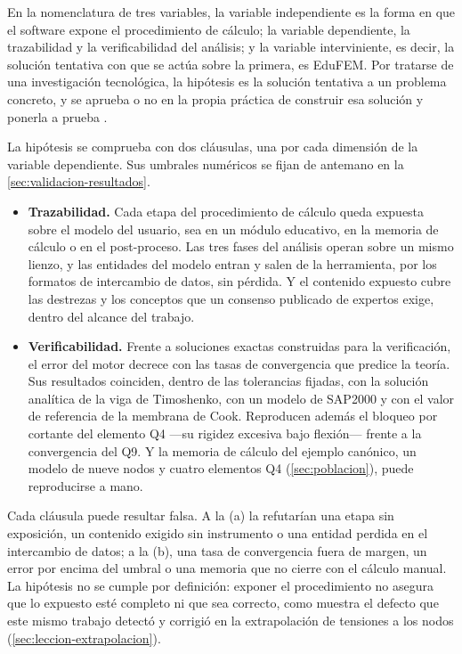 En la nomenclatura de tres variables, la variable independiente es la forma en que el software expone el procedimiento de cálculo; la variable dependiente, la trazabilidad y la verificabilidad del análisis; y la variable interviniente, es decir, la solución tentativa con que se actúa sobre la primera, es EduFEM. Por tratarse de una investigación tecnológica, la hipótesis es la solución tentativa a un problema concreto, y se aprueba o no en la propia práctica de construir esa solución y ponerla a prueba \autocite[p.~85]{garciacordoba2005tecnologica}.

La hipótesis se comprueba con dos cláusulas, una por cada dimensión de la variable dependiente. Sus umbrales numéricos se fijan de antemano en la \autoref{sec:validacion-resultados}.

\begin{itemize}
    \item[(a)] \textbf{Trazabilidad.} Cada etapa del procedimiento de cálculo queda expuesta sobre el modelo del usuario, sea en un módulo educativo, en la memoria de cálculo o en el post-proceso. Las tres fases del análisis operan sobre un mismo lienzo, y las entidades del modelo entran y salen de la herramienta, por los formatos de intercambio de datos, sin pérdida. Y el contenido expuesto cubre las destrezas y los conceptos que un consenso publicado de expertos exige, dentro del alcance del trabajo.
    \item[(b)] \textbf{Verificabilidad.} Frente a soluciones exactas construidas para la verificación, el error del motor decrece con las tasas de convergencia que predice la teoría. Sus resultados coinciden, dentro de las tolerancias fijadas, con la solución analítica de la viga de Timoshenko, con un modelo de SAP2000 y con el valor de referencia de la membrana de Cook. Reproducen además el bloqueo por cortante del elemento Q4 ---su rigidez excesiva bajo flexión--- frente a la convergencia del Q9. Y la memoria de cálculo del ejemplo canónico, un modelo de nueve nodos y cuatro elementos Q4 (\autoref{sec:poblacion}), puede reproducirse a mano.
\end{itemize}

Cada cláusula puede resultar falsa. A la (a) la refutarían una etapa sin exposición, un contenido exigido sin instrumento o una entidad perdida en el intercambio de datos; a la (b), una tasa de convergencia fuera de margen, un error por encima del umbral o una memoria que no cierre con el cálculo manual. La hipótesis no se cumple por definición: exponer el procedimiento no asegura que lo expuesto esté completo ni que sea correcto, como muestra el defecto que este mismo trabajo detectó y corrigió en la extrapolación de tensiones a los nodos (\autoref{sec:leccion-extrapolacion}).

